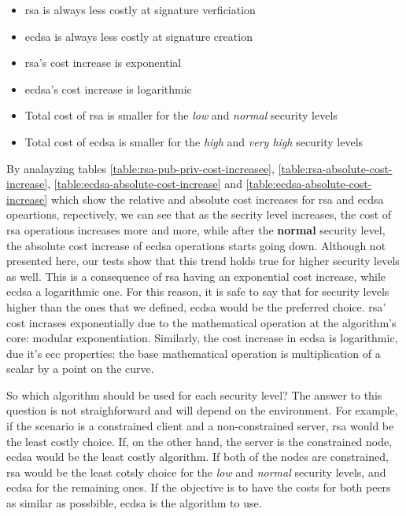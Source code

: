 \documentclass{llncs}
\begin{document}
\begin{itemize}
  \item \gls{rsa} is always less costly at signature verficiation
  \item \gls{ecdsa} is always less costly at signature creation
  \item \gls{rsa}'s cost increase is exponential
  \item \gls{ecdsa}'s cost increase is logarithmic
  \item Total cost of \gls{rsa} is smaller for the \textit{low} and \textit{normal} security levels
  \item Total cost of \gls{ecdsa} is smaller for the \textit{high} and \textit{very high} security levels
\end{itemize}

By analayzing tables \ref{table:rsa-pub-priv-cost-increasee}, \ref{table:rsa-absolute-cost-increase}, \ref{table:ecdsa-absolute-cost-increase} and
\ref{table:ecdsa-absolute-cost-increase} which show the relative and absolute cost increases for \gls{rsa} and \gls{ecdsa} opeartions, repectively,
we can see that as the secrity level increases, the cost of \gls{rsa} operations increases more and more, while after the \textbf{normal} security
level, the absolute cost increase of \gls{ecdsa} operations starts going down. Although not presented here, our tests show that this trend holds true
for higher security levels as well. This is a consequence of \gls{rsa} having an exponential cost increase, while \gls{ecdsa} a logarithmic one.
For this reason, it is safe to say that for security levels higher than the ones that we defined, \gls{ecdsa} would be the preferred choice.
\gls{rsa}' cost incrases exponentially due to the mathematical operation at the algorithm's core: modular exponentiation. Similarly, the cost
increase in \gls{ecdsa} is logarithmic, due it's \gls{ecc} properties: the base mathematical operation is multiplication of a scalar by a point on the
curve.

So which algorithm should be used for each security level? The answer to this question is not straighforward and will depend on the environment.
For example, if the scenario is a constrained client and a non-constrained server, \gls{rsa} would be the least costly choice. If, on the
other hand, the server is the constrained node, \gls{ecdsa} would be the least costly algorithm. If both of the nodes are
constrained, \gls{rsa} would be the least cotsly choice for the \textit{low} and \textit{normal} security levels, and \gls{ecdsa} for the remaining ones. 
If the objective is  to have the costs for both peers as similar as possbible, \gls{ecdsa} is the algorithm to use.
\end{document}
